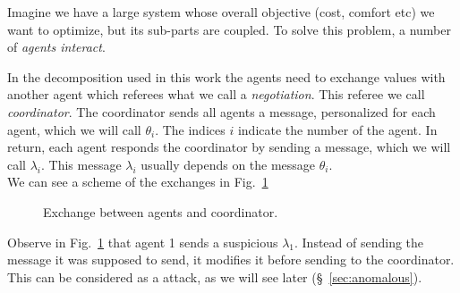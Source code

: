 \documentclass[../main.tex]{subfiles}
\begin{document}
\begin{example}\label{ex:qualitative_example}
  Imagine we have a large system whose overall objective (cost, comfort etc) we want to optimize, but its sub-parts are coupled.
  To solve this problem, a number of \emph{agents interact}.

  In the decomposition used in this work the agents need to exchange values with another agent which referees what we call a \emph{negotiation}. This referee we call \emph{coordinator}.
  The coordinator sends all agents a message, personalized for each agent, which we will call $\theta_{i}$. The indices $i$ indicate the number of the agent.
  In return, each agent responds the coordinator by sending a message, which we will call $\lambda_{i}$.
  This message $\lambda_{i}$ usually depends on the message $\theta_{i}$.\\
  We can see a scheme of the exchanges in Fig.~\ref{fig:ex_exchange_agents}


  \begin{figure}[H]
    \centering
    \caption{Exchange between agents and coordinator.}\label{fig:ex_exchange_agents}
  \end{figure}
  Observe in Fig.~\ref{fig:ex_exchange_agents} that agent 1 sends a suspicious $\lambda_{1}$. Instead of sending the message it was supposed to send, it modifies it before sending to the coordinator.
  This can be considered as a \fdi{} attack, as we will see later (\S~\ref{sec:anomalous}).


\end{example}
\end{document}
